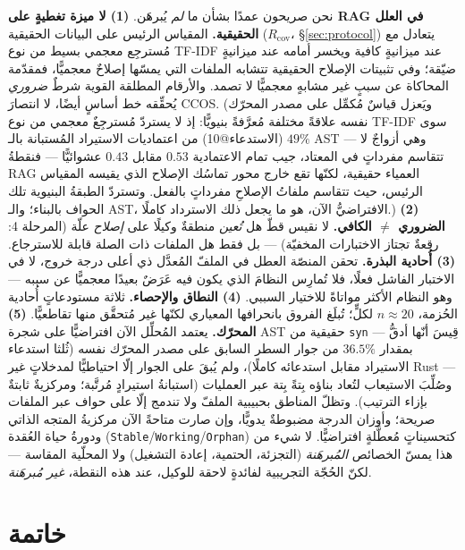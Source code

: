 \documentclass[11pt]{article}
\newcommand{\code}[1]{\textenglish{\texttt{#1}}}
\begin{document}
نحن صريحون عمدًا بشأن ما \emph{لم} يُبرهَن.
\textbf{(1) لا ميزة تغطيةٍ على RAG في العلل الحقيقية.} المقياس الرئيس على البيانات الحقيقية
($R_{\mathrm{cov}}$، \S\ref{sec:protocol}) يتعادل مع مُسترجِع معجمي بسيط من نوع TF-IDF عند
ميزانيةٍ كافية ويخسر أمامه عند ميزانيةٍ ضيّقة؛ وفي تثبيتات الإصلاح الحقيقية تتشابه الملفات
التي يمسّها إصلاحٌ معجميًّا، فمقدّمة المحاكاة عن سببٍ غير مشابهٍ معجميًّا لا تصمد. والأرقام
المطلقة القوية شرطٌ \emph{ضروري} يُحقِّقه خط أساسٍ أيضًا، لا انتصارَ CCOS.
(ويَعزل قياسٌ مُكمِّل على مصدر المحرّك نفسه علاقةً مختلفة مُعرَّفةً بنيويًّا: إذ لا يستردّ مُسترجِعٌ معجمي من نوع TF-IDF سوى $49\%$ (الاستدعاء@10) من اعتماديات الاستيراد المُستبانة بالـ AST --- وهي أزواجٌ لا تتقاسم مفرداتٍ في المعتاد، جيب تمام الاعتمادية $0.53$ مقابل $0.43$ عشوائيًّا --- فنقطةُ RAG العمياء حقيقية، لكنّها تقع خارج محور تماسُك الإصلاح الذي يقيسه المقياس الرئيس، حيث تتقاسم ملفاتُ الإصلاحِ مفرداتٍ بالفعل. وتستردّ الطبقةُ البنيوية تلك الحواف بالبناء؛ والـ AST، الافتراضيُّ الآن، هو ما يجعل ذلك الاسترداد كاملًا.)
\textbf{(2) الضروري $\neq$ الكافي.} لا نقيس قطّ هل \emph{تُعين} منطقةٌ وكيلًا على \emph{إصلاح}
علّة (المرحلة 4: رقعةٌ تجتاز الاختبارات المخفيّة) --- بل فقط هل الملفات ذات الصلة قابلة
للاسترجاع.
\textbf{(3) أُحادية البذرة.} تحقن المنصّة العطل في الملفّ المُعدَّل ذي أعلى درجة خروج، لا في
الاختبار الفاشل فعلًا، فلا تُمارِس النظامَ الذي يكون فيه عَرَضٌ بعيدًا معجميًّا عن سببه --- وهو
النظام الأكثر مواتاةً للاختيار السببي.
\textbf{(4) النطاق والإحصاء.} ثلاثة مستودعاتٍ أُحادية الحُزمة، $n\!\approx\!20$ لكلٍّ؛ تُبلَغ
الفروق بانحرافها المعياري لكنّها غير مُتحقَّق منها تقاطعيًّا.
\textbf{(5) المحرّك.} يعتمد المُحلِّل الآن افتراضيًّا على شجرة AST حقيقية من \code{syn} ---
قِيسَ أنّها أدقُّ بمقدار $36.5\%$ من جوار السطر السابق على مصدر المحرّك نفسه (ثُلثا استدعاء
الاستيراد مقابل استدعائه كاملًا)، ولم يُبقَ على الجوار إلّا احتياطيًّا لمدخلاتٍ غير Rust ---
وصُلِّبَ الاستيعاب لتُعاد بناؤه بِتةً بِتة عبر العمليات (استبانةُ استيرادٍ مُرتَّبة؛ ومركزيةٌ
ثابتةٌ بإزاء الترتيب). وتظلّ المناطق بحبيبية الملفّ ولا تندمج إلّا على حواف عبر الملفات
صريحة؛ وأوزان الدرجة مضبوطةٌ يدويًّا، وإن صارت متاحةً الآن مركزيةُ المتجه الذاتي ودورةُ حياة
العُقدة (\code{Stable}/\code{Working}/\code{Orphan}) كتحسيناتٍ مُعطَّلةٍ افتراضيًّا. لا شيء من
هذا يمسّ الخصائص \emph{المُبرهَنة} (التجزئة، الحتمية، إعادة التشغيل) ولا المحلّية المقاسة ---
لكنّ الحُجّة التجريبية لفائدةٍ لاحقة للوكيل، عند هذه النقطة، \emph{غير مُبرهَنة}.

\section{خاتمة}
\end{document}
